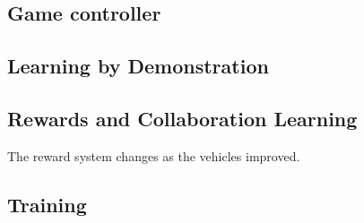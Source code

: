\subsection{Game controller}
\subsection{Learning by Demonstration}


\subsection{Rewards and Collaboration Learning}
The reward system changes as the vehicles improved. 

\subsection{Training}







